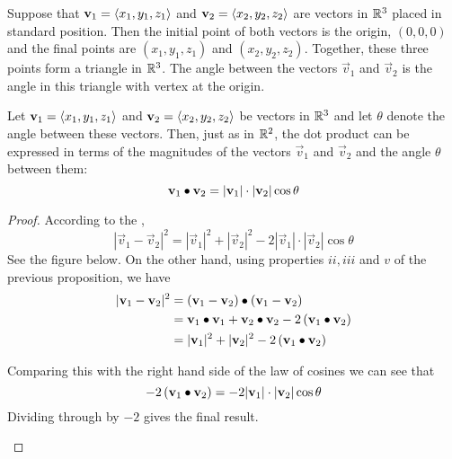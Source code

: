 \documentclass[handout]{ximera}
\begin{document}
Suppose that $\mathbf{v}_1=\left\langle x_1, y_1, z_1\right\rangle$ and $\mathbf{v}_2=\left\langle x_2, y_2, z_2\right\rangle$  are vectors in $\mathbb R^3$ placed in standard position.  
Then the initial point of both vectors is the origin, $(0,0,0)$ and the final points are
$(x_1, y_1, z_1)$ and $(x_2, y_2, z_2)$.  Together, these three points form a triangle in $\mathbb R^3$.  
The angle between the vectors $\vec{v}_1$ and $\vec{v}_2$ is the angle in this triangle with vertex at the origin.

\begin{proposition}
Let $\mathbf{v}_1 = \left\langle x_1, y_1, z_1\right\rangle$ and $\mathbf{v}_2 = \left\langle x_2, y_2, z_2\right\rangle$
be vectors in $\mathbb R^3$ and let $\theta$ denote the angle between these vectors.  
Then, just as in $\mathbb R^2$, the dot product can be expressed in terms of the 
magnitudes of the vectors $\vec{v}_1$ and $\vec{v}_2$ and the angle $\theta$ between them:
\[
\mathbf{v}_1\bullet\mathbf{v}_2 = |\mathbf{v}_1|\cdot |\mathbf{v}_2| \cos\theta
\]
\begin{proof}
According to the , 
\[
|\vec{v}_1 - \vec{v}_2|^2 = |\vec{v}_1|^2 + |\vec{v}_2|^2 - 2|\vec{v}_1|\cdot| \vec{v}_2|\cos \theta
\]
See the figure below. On the other hand, using properties $ii, iii$ and $v$ of the previous proposition, we have
\begin{align*}
|\mathbf{v}_1 - \mathbf{v}_2|^2 &= \left(\mathbf{v}_1 - \mathbf{v}_2\right)\bullet \left(\mathbf{v}_1 - \mathbf{v}_2\right)\\
                          &= \mathbf{v}_1 \bullet \mathbf{v}_1 + \mathbf{v}_2 \bullet \mathbf{v}_2 - 2\left(\mathbf{v}_1 \bullet \mathbf{v}_2\right)\\
                          &=|\mathbf{v}_1|^2 + |\mathbf{v}_2|^2 - 2\left(\mathbf{v}_1 \bullet \mathbf{v}_2\right)
\end{align*}

Comparing this with the right hand side of the law of cosines we can see that
\[
- 2\left(\mathbf{v}_1 \bullet \mathbf{v}_2\right) = - 2|\mathbf{v}_1|\cdot| \mathbf{v}_2|\cos \theta
\]
Dividing through by $-2$ gives the final result.

\begin{image}
\end{image}

\end{proof}

\end{proposition}
\end{document}
